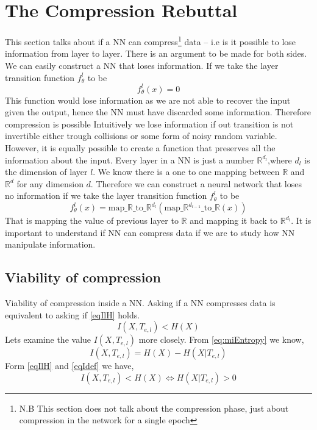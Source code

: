 \documentclass[dissertation.tex]{subfiles}
\begin{document}
\section{The Compression Rebuttal}

This section talks about if a NN can compress\footnote{ N.B This section does
not talk about the compression phase, just about compression in the network for
a single epoch } data -- i.e is it possible to lose information from layer to
layer. There is an argument to be made for both sides. We can easily construct a
NN that loses information. If we take the layer transition function $f_\theta^l$
to be 
\begin{equation*}
  f_\theta^{l}(x) = 0
\end{equation*}
This function would lose information as we are not able to recover the input
given the output, hence the NN must have discarded some information.
Therefore
compression is possible
Intuitively we lose information if out transition is not invertible either
trough collisions or some form of noisy random variable.
However, it is equally possible to create a
function that preserves all the information about the input. Every layer in a NN
is just a number $\mathbb{R}^{d_l}$,where $d_l$ is the dimension of layer $l$.
We know there is a one to one mapping between $\mathbb{R}$ and $\mathbb{R}^{d}$
for any dimension $d$. Therefore we can construct a neural network that loses no
information if we take the layer transition function $f_\theta^l$ to be
\begin{equation*}
  f_\theta^{l}(x) =
  \text{map}\_\mathbb{R}\_\text{to}\_\mathbb{R}^{d_l}(
  \text{map}\_\mathbb{R}^{d_{l-1}}\_\text{to}\_\mathbb{R}(x))
\end{equation*}
That is mapping the value of previous layer to $\mathbb{R}$ and mapping it back
to $\mathbb{R}^{d_l}$. It is important to understand if NN can compress data if
we are to study how NN manipulate information.

\subsection{Viability of compression} \label{subViabilityOfCompression}

Viability of compression inside a NN. Asking if a NN compresses data is
equivalent to asking if \autoref{eqIlH} holds.
\begin{equation} 
  I(X, T_{e,l}) < H(X)
  \label{eqIlH}
\end{equation}
Lets examine the value $I(X, T_{e,l})$ more closely. From
\autoref{eq:miEntropy} we know,
\begin{equation} 
  I(X,T_{e,l})=H(X)-H(X|T_{e,l})
  \label{eqIdef}
\end{equation}
Form \autoref{eqIlH} and \autoref{eqIdef} we have,
\begin{equation} 
  I(X, T_{e,l}) < H(X) 
  \Leftrightarrow 
  H(X|T_{e,l}) > 0
  \label{eqIHH}
\end{equation}
\end{document}
